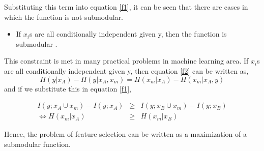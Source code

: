  Substituting this term into equation \ref{f1}, it can be seen that there are cases in which the function is not submodular.
\begin{itemize}
\item {\bf \lemma} If $x_i$s are all conditionally independent given y, then the function is submodular \cite{krausefeature}.
\end{itemize}

This constraint is met in many practical problems in machine learning area. If $x_i$s are all conditionally independent given y, then equation \ref{f2} can be written as,
\begin{equation*}
H(y|x_A)-H(y|x_A,x_m)=H(x_m|x_A)-H(x_m|x_A,y)
\end{equation*}
and if we substitute this in equation \ref{f1},


\begin{eqnarray*}
I(y;x_A \cup x_m) - I(y;x_A) &\geq & I(y;x_B \cup x_m) - I(y;x_B) \nonumber \\
\Leftrightarrow H(x_m|x_A) &\geq & H(x_m|x_B)
\end{eqnarray*} 

Hence, the problem of feature selection can be written as a maximization of a submodular function.\cite{jie}
